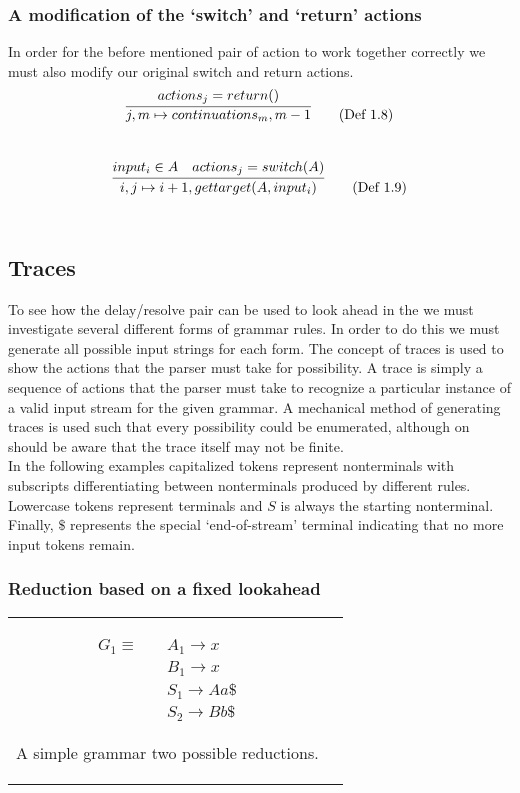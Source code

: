 \documentclass[11pt]{article}
\begin{document}
\subsubsection{A modification of the `switch' and `return' actions}
In order for the before mentioned pair of action to work together correctly we must also modify our original switch and return actions.
\begin{equation}
\infer{j, m \mapsto continuations_m, m-1}{actions_j = return()} \tag{Def 1.8}
\end{equation}\\

\begin{equation}
\infer{i, j \mapsto i+1, gettarget(A, input_i)}{input_i \in A & actions_j = switch(A)} \tag{Def 1.9}
\end{equation}\\


\subsection{Traces}
To see how the delay/resolve pair can be used to look ahead in the we must investigate several different forms of grammar rules.
In order to do this we must generate all possible input strings for each form. 
The concept of traces is used to show the actions that the parser must take for possibility.
A trace is simply a sequence of actions that the parser must take to recognize a particular instance of a valid input stream for the given grammar.
A mechanical method of generating traces is used such that every possibility could be enumerated, although on should be aware that the trace itself may not be finite.\\

In the following examples capitalized tokens represent nonterminals with subscripts differentiating between nonterminals produced by different rules. 
Lowercase tokens represent terminals and $S$ is always the starting nonterminal. 
Finally, $\$$ represents the special `end-of-stream' terminal indicating that no more input tokens remain.\\

\subsubsection{Reduction based on a fixed lookahead}
\begin{tabular}[t]{cl}
\parbox{.3\textwidth}{
\begin{align*}
G_1 \equiv \quad & A_1 \rightarrow x\\
                 & B_1 \rightarrow x\\
                 & S_1 \rightarrow A a \$\\
                 & S_2 \rightarrow B b \$
\end{align*}}
\parbox{.8\textwidth}{A simple grammar two possible reductions.}
\end{tabular}
\end{document}
